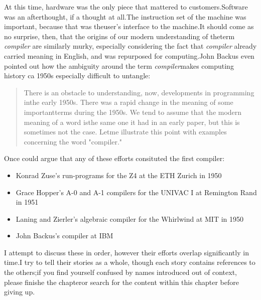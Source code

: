 At this time, hardware was the only piece that mattered to customers.Software
was an afterthought, if a thought at all.The instruction set of the machine was
important, because that was theuser's interface to the machine.It should come
as no surprise, then, that the origins of our modern understanding of theterm
\textit{compiler} are similarly murky, especially considering the fact that
\textit{compiler} already carried meaning in English, and was repurposed for
computing.John Backus even pointed out how the ambiguity around the term
\textit{compiler}makes computing history ca 1950s especially difficult to
untangle:
\begin{quotation}
    There is an obstacle to understanding, now, developments in programming inthe early 1950s. There was a rapid change in the meaning of some importantterms during the 1950s. We tend to assume that the modern meaning of a word isthe same one it had in an early paper, but this is sometimes not the case. Letme illustrate this point with examples concerning the word "compiler."
    \cite{Backus_1980_Programming_in_America_in_1950s}
\end{quotation}
\bigskip
Once could argue that any of these efforts consituted the first compiler:
\begin{itemize}
    \item Konrad Zuse's run-programs for the Z4 at the ETH Zurich in 1950
    \item Grace Hopper's A-0 and A-1 compilers for the UNIVAC I at Remington Rand in 1951 \item Laning and Zierler's algebraic compiler for the Whirlwind at MIT in 1950
    \item John Backus's \FTNI{} compiler at IBM
\end{itemize}

I attempt to discuss these in order, however their efforts overlap
significantly in time.I try to tell their stories as a whole, though each story
contains references to the others;if you find yourself confused by names
introduced out of context, please finishe the chapteror search for the content
within this chapter before giving up.
